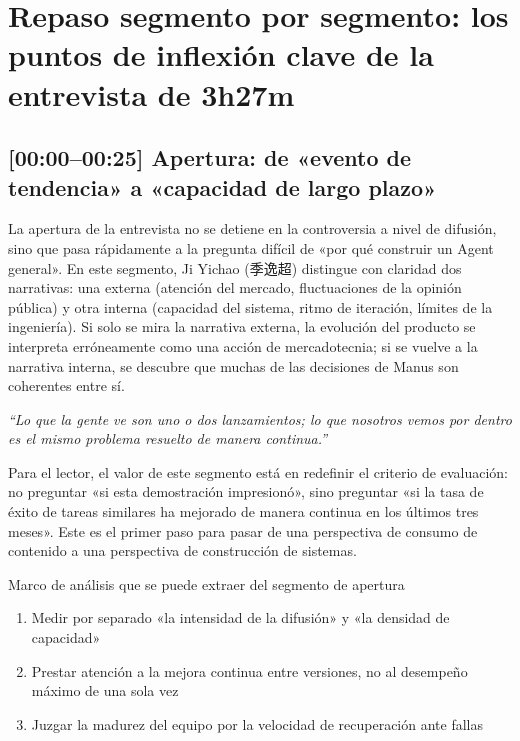 \section{Repaso segmento por segmento: los puntos de inflexión clave de la entrevista de 3h27m}

\subsection{[00:00--00:25] Apertura: de «evento de tendencia» a «capacidad de largo plazo»}

La apertura de la entrevista no se detiene en la controversia a nivel de difusión, sino que pasa rápidamente a la pregunta difícil de «por qué construir un Agent general». En este segmento, Ji Yichao (季逸超) distingue con claridad dos narrativas: una externa (atención del mercado, fluctuaciones de la opinión pública) y otra interna (capacidad del sistema, ritmo de iteración, límites de la ingeniería). Si solo se mira la narrativa externa, la evolución del producto se interpreta erróneamente como una acción de mercadotecnia; si se vuelve a la narrativa interna, se descubre que muchas de las decisiones de Manus son coherentes entre sí.

\textit{``Lo que la gente ve son uno o dos lanzamientos; lo que nosotros vemos por dentro es el mismo problema resuelto de manera continua.''}

Para el lector, el valor de este segmento está en redefinir el criterio de evaluación: no preguntar «si esta demostración impresionó», sino preguntar «si la tasa de éxito de tareas similares ha mejorado de manera continua en los últimos tres meses». Este es el primer paso para pasar de una perspectiva de consumo de contenido a una perspectiva de construcción de sistemas.

\begin{knowledgebox}{Marco de análisis que se puede extraer del segmento de apertura}
\begin{enumerate}
    \item Medir por separado «la intensidad de la difusión» y «la densidad de capacidad»
    \item Prestar atención a la mejora continua entre versiones, no al desempeño máximo de una sola vez
    \item Juzgar la madurez del equipo por la velocidad de recuperación ante fallas
\end{enumerate}
\end{knowledgebox}

